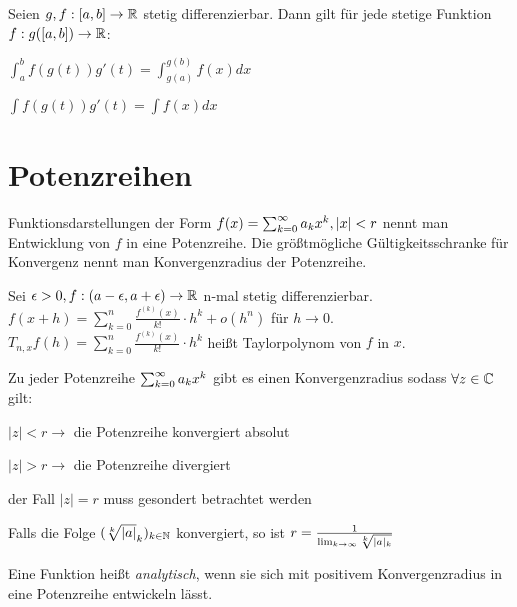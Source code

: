 \begin{satz}
	Seien $g,f : [a,b] \rightarrow \mathbb{R}$ stetig differenzierbar. Dann gilt für jede stetige Funktion $f : g([a,b]) \rightarrow \mathbb{R}$:
	\begin{description}[noitemsep]
		\item $\int_{a}^{b} f(g(t))g'(t) = \int_{g(a)}^{g(b)}f(x)dx$
		\item $\int f(g(t))g'(t) = \int f(x)dx$
	\end{description}
\end{satz}


\section{Potenzreihen}

\begin{definition}
	Funktionsdarstellungen der Form $f(x) = \sum_{k = 0}^{\infty} a_{k}x^k, |x| < r$ nennt man Entwicklung von $f$ in eine Potenzreihe. Die größtmögliche Gültigkeitsschranke für Konvergenz nennt man Konvergenzradius der Potenzreihe.
\end{definition}

\begin{satz}
	Sei $\epsilon > 0, f : (a-\epsilon, a +\epsilon) \rightarrow \mathbb{R}$ n-mal stetig differenzierbar. $f(x+h) = \sum_{k = 0}^n \frac{f^{(k)}(x)}{k!} \cdot h^k + o(h^n)$ für $h \rightarrow 0$. $T_{n,x}f(h) = \sum_{k = 0}^n \frac{f^{(k)}(x)}{k!} \cdot h^k$ heißt Taylorpolynom von $f$ in $x$.
\end{satz}

\begin{satz}
	Zu jeder Potenzreihe $\sum_{k = 0}^{\infty} a_{k}x^k$ gibt es einen Konvergenzradius sodass $\forall z \in \mathbb{C}$ gilt:
	\begin{description}[noitemsep]
		\item $|z| < r \rightarrow $ die Potenzreihe konvergiert absolut
		\item $|z| > r \rightarrow $ die Potenzreihe divergiert
		\item der Fall $|z| = r$ muss gesondert betrachtet werden
	\end{description}
	Falls die Folge $(\sqrt[k]{|a|}_{k})_{k \in \mathbb{N}}$ konvergiert, so ist $r = \frac{1}{\lim_{k \rightarrow \infty}\sqrt[k]{|a|_k}}$
\end{satz}

\begin{definition}
	Eine Funktion heißt \emph{analytisch}, wenn sie sich mit positivem Konvergenzradius in eine Potenzreihe entwickeln lässt.
\end{definition}

